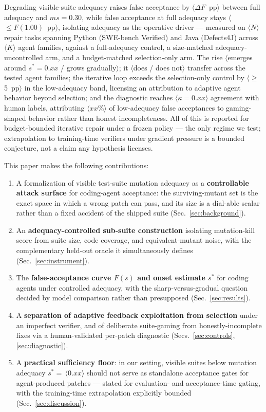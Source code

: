 \documentclass[conference]{IEEEtran}
\newcommand{\PH}[1]{\colorbox{gray!18}{\small$\langle$#1$\rangle$}}
\newcommand{\ms}{\ensuremath{\mathit{ms}}}
\newcommand{\Fs}{\ensuremath{F(s)}}
\begin{document}
Degrading visible-suite adequacy raises false acceptance by
\PH{$\Delta F$~pp} between full adequacy and $\ms{=}0.30$, while false
acceptance at full adequacy stays \PH{$\le F(1.00)$~pp}, isolating
adequacy as the operative driver --- measured on \PH{$N$} repair tasks
spanning Python (SWE-bench Verified) and Java (Defects4J) across
\PH{$K$} agent families, against a full-adequacy control, a size-matched
adequacy-uncontrolled arm, and a budget-matched selection-only arm. The
rise \PH{emerges around $s^\ast{=}0.xx$ / grows gradually}; it
\PH{does / does not} transfer across the tested agent families; the
iterative loop exceeds the selection-only control by \PH{$\ge$5~pp} in the
low-adequacy band, licensing an attribution to adaptive agent behavior
beyond selection; and the diagnostic reaches \PH{$\kappa{=}0.xx$}
agreement with human labels, attributing \PH{$xx\%$} of low-adequacy
false acceptances to gaming-shaped behavior rather than honest
incompleteness. All of this is reported for budget-bounded iterative
repair under a frozen policy --- the only regime we test; extrapolation to
training-time verifiers under gradient pressure is a bounded conjecture,
not a claim any hypothesis licenses.

This paper makes the following contributions:
\begin{enumerate}[leftmargin=1.5em]
\item A formalization of visible test-suite mutation adequacy as a
\textbf{controllable attack surface} for coding-agent acceptance: the
surviving-mutant set is the exact space in which a wrong patch can pass,
and its size is a dial-able scalar rather than a fixed accident of the
shipped suite (Sec.~\ref{sec:background}).
\item An \textbf{adequacy-controlled sub-suite construction} isolating
mutation-kill score from suite size, code coverage, and equivalent-mutant
noise, with the complementary held-out oracle it simultaneously defines
(Sec.~\ref{sec:instrument}).
\item The \textbf{false-acceptance curve \Fs{} and onset estimate
$s^\ast$} for coding agents under controlled adequacy, with the
sharp-versus-gradual question decided by model comparison rather than
presupposed (Sec.~\ref{sec:results}).
\item A \textbf{separation of adaptive feedback exploitation from
selection} under an imperfect verifier, and of deliberate suite-gaming
from honestly-incomplete fixes via a human-validated per-patch diagnostic
(Secs.~\ref{sec:controls}, \ref{sec:diagnostic}).
\item A \textbf{practical sufficiency floor}: in our setting, visible
suites below mutation adequacy $s^\ast{=}$\,\PH{$0.xx$} should not serve
as standalone acceptance gates for agent-produced patches --- stated for
evaluation- and acceptance-time gating, with the training-time
extrapolation explicitly bounded (Sec.~\ref{sec:discussion}).
\end{enumerate}
\end{document}
